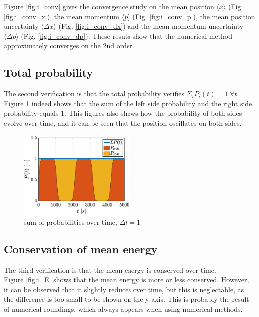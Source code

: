 \documentclass[a4paper,12pt,twoside]{article}
\begin{document}
    Figure \ref{fig:i_conv} gives the convergence study on the mean position $\langle x \rangle$ (Fig. \ref{fig:i_conv_x}), the mean momentum $\langle p \rangle$ (Fig. \ref{fig:i_conv_p}), the mean position uncertainty $\langle \Delta x \rangle$ (Fig. \ref{fig:i_conv_dx}) and the mean momentum uncertainty $\langle \Delta p \rangle$ (Fig. \ref{fig:i_conv_dp}).
    These resuts show that the numerical method approximately converges on the 2nd order.


  \subsection{Total probability}
    The second verification is that the total probability verifies $\Sigma_i P_i(t) = 1~\forall t$.\\

    Figure \ref{fig:i_ptot} indeed shows that the sum of the left side probability and the right side probability equals 1.
    This figures also shows how the probability of both sides evolve over time, and it can be seen that the position oscillates on both sides.

    \begin{figure}[h]
      \centering
      \includegraphics[width=0.5\textwidth]{graphs/i_ptot.eps}
      \caption{sum of probabilities over time, $\Delta t = 1$}
      \label{fig:i_ptot}
    \end{figure}


  \subsection{Conservation of mean energy}
    The third verification is that the mean energy is conserved over time.\\

    Figure \ref{fig:i_E} shows that the mean energy is more or less conserved.
    However, it can be observed that it slightly reduces over time, but this is neglectable, as the difference is too small to be shown on the y-axis. This is probably the result of numerical roundings, which always appears when using numerical methods.
\end{document}
